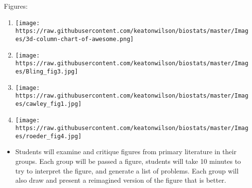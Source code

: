 \documentclass[]{article}
\providecommand{\tightlist}{%
  \setlength{\itemsep}{0pt}\setlength{\parskip}{0pt}}
\begin{document}
Figures:

\begin{enumerate}
\def\labelenumi{\arabic{enumi}.}
\item
  \texttt{[image: https://raw.githubusercontent.com/keatonwilson/biostats/master/Images/3d-column-chart-of-awesome.png]}
\item
  \texttt{[image: https://raw.githubusercontent.com/keatonwilson/biostats/master/Images/Bling\_fig3.jpg]}
\item
  \texttt{[image: https://raw.githubusercontent.com/keatonwilson/biostats/master/Images/cawley\_fig1.jpg]}
\item
  \texttt{[image: https://raw.githubusercontent.com/keatonwilson/biostats/master/Images/roeder\_fig4.jpg]}
\end{enumerate}

\begin{itemize}
\tightlist
\item
  Students will examine and critique figures from primary literature in
  their groups. Each group will be passed a figure, students will take
  10 minutes to try to interpret the figure, and generate a list of
  problems. Each group will also draw and present a reimagined version
  of the figure that is better.
\end{itemize}
\end{document}
